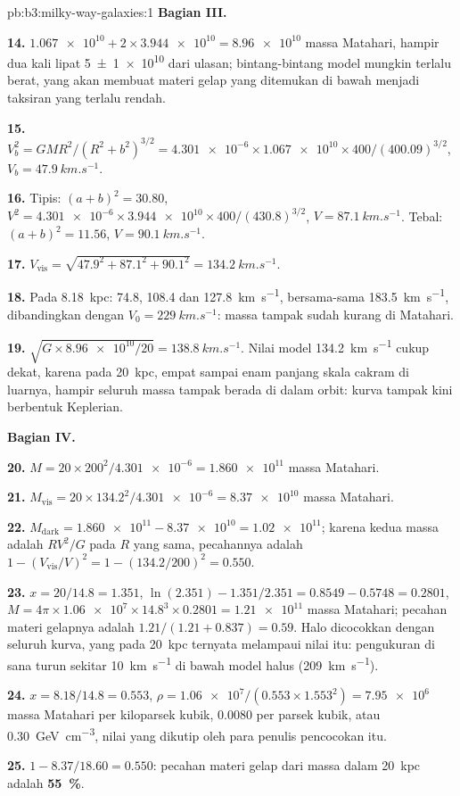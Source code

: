 \begin{solution}{pb:b3:milky-way-galaxies:1}
\textbf{Bagian III.}

\textbf{14.} $\num{1.067e10} + 2\times\num{3.944e10} = \num{8.96e10}$ massa
Matahari, hampir dua kali lipat \num[separate-uncertainty=true]{5 \pm 1 e10} dari ulasan; bintang-bintang
model mungkin terlalu berat, yang akan membuat materi gelap yang ditemukan di bawah
menjadi taksiran yang terlalu rendah.

\textbf{15.} $V_b^2 = GMR^2/(R^2 + b^2)^{3/2} = \num{4.301e-6}\times\num{1.067e10}
\times400/(400.09)^{3/2}$, $V_b = \qty{47.9}{km.s^{-1}}$.

\textbf{16.} Tipis: $(a + b)^2 = 30.80$, $V^2 = \num{4.301e-6}\times\num{3.944e10}
\times400/(430.8)^{3/2}$, $V = \qty{87.1}{km.s^{-1}}$. Tebal:
$(a + b)^2 = 11.56$, $V = \qty{90.1}{km.s^{-1}}$.

\textbf{17.} $V_\mathrm{vis} = \sqrt{47.9^2 + 87.1^2 + 90.1^2} =
\qty{134.2}{km.s^{-1}}$.

\textbf{18.} Pada \qty{8.18}{kpc}: 74.8, 108.4 dan \qty{127.8}{km.s^{-1}},
bersama-sama \qty{183.5}{km.s^{-1}}, dibandingkan dengan $V_0 = \qty{229}{km.s^{-1}}$:
massa tampak sudah kurang di Matahari.

\textbf{19.} $\sqrt{G\times\num{8.96e10}/20} = \qty{138.8}{km.s^{-1}}$. Nilai
model \qty{134.2}{km.s^{-1}} cukup dekat, karena pada \qty{20}{kpc},
empat sampai enam panjang skala cakram di luarnya, hampir seluruh massa tampak
berada di dalam orbit: kurva tampak kini berbentuk Keplerian.

\textbf{Bagian IV.}

\textbf{20.} $M = 20\times200^2/\num{4.301e-6} = \num{1.860e11}$ massa Matahari.

\textbf{21.} $M_\mathrm{vis} = 20\times134.2^2/\num{4.301e-6} = \num{8.37e10}$
massa Matahari.

\textbf{22.} $M_\mathrm{dark} = \num{1.860e11} - \num{8.37e10} = \num{1.02e11}$;
karena kedua massa adalah $RV^2/G$ pada $R$ yang sama, pecahannya adalah
$1 - (V_\mathrm{vis}/V)^2 = 1 - (134.2/200)^2 = \num{0.550}$.

\textbf{23.} $x = 20/14.8 = 1.351$, $\ln(2.351) - 1.351/2.351 = 0.8549 - 0.5748
= 0.2801$, $M = 4\pi\times\num{1.06e7}\times14.8^3\times0.2801 =
\num{1.21e11}$ massa Matahari; pecahan materi gelapnya adalah
$1.21/(1.21 + 0.837) = \num{0.59}$. Halo dicocokkan dengan seluruh
kurva, yang pada \qty{20}{kpc} ternyata melampaui nilai itu: pengukuran di sana
turun sekitar \qty{10}{km.s^{-1}} di bawah model halus (\qty{209}{km.s^{-1}}).

\textbf{24.} $x = 8.18/14.8 = 0.553$, $\rho = \num{1.06e7}/(0.553\times1.553^2)
= \num{7.95e6}$ massa Matahari per kiloparsek kubik, \num{0.0080} per
parsek kubik, atau \qty{0.30}{GeV.cm^{-3}}, nilai yang dikutip oleh para penulis
pencocokan itu.

\textbf{25.} $1 - 8.37/18.60 = \num{0.550}$: pecahan materi gelap dari massa
dalam \qty{20}{kpc} adalah
\textbf{\qty[text-series-to-math=true]{55}{\percent}}.
\end{solution}
